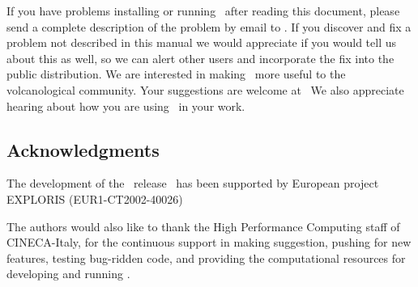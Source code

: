 If you have problems installing or running \PDAC\ after
reading this document, please send a
complete description of the problem by email to \PDACADDRESS.
If you discover and fix a problem not described in this manual we would
appreciate if you would tell us about this as well, so we can alert
other users and incorporate the fix into the public distribution.
\prettypar
We are interested in making \PDAC\ more useful to the volcanological
community.  Your suggestions are welcome at \PDACADDRESS\ 
We also appreciate hearing about how you are using \PDAC\ in your work.


\subsection{Acknowledgments}

The development of the \PDAC\ release \PDACVERSION\ has been supported 
by European project EXPLORIS (EUR1-CT2002-40026)

The authors would also like to thank the High Performance Computing
staff of CINECA-Italy, for the continuous support in making suggestion, pushing
for new features, testing bug-ridden code, and providing the computational 
resources for developing and running \PDAC.
\prettypar
